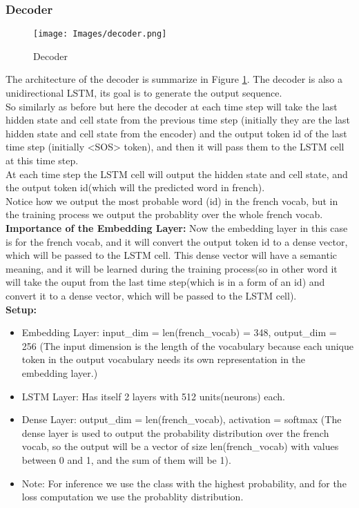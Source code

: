 \documentclass{article}
\begin{document}
\subsubsection{Decoder}
\begin{figure}[H]
    \centering
    \texttt{[image: Images/decoder.png]}
    \caption{Decoder}
    \label{fig:decoder}
\end{figure}
The architecture of the decoder is summarize in Figure \hyperref[fig:decoder]{\ref*{fig:decoder}}.
The decoder is also a unidirectional LSTM, its goal is to generate the output sequence.\\ So similarly as before but here the decoder at each time step will take the last hidden state and cell state from the previous time step (initially they are the last hidden state and cell state from the encoder) and the output token id of the last time step (initially <SOS> token), and then it will pass them to the LSTM cell  at this time step.\\
At each time step the LSTM cell will output the hidden state and cell state, and the output token id(which will the predicted word in french).\\Notice how we output the most probable word (id) in the french vocab, but in the training process we output the probablity over the whole french vocab.\\
\textbf{Importance of the Embedding Layer:} Now the embedding layer in this case is for the french vocab, and it will convert the output token id to a dense vector, which will be passed to the LSTM cell. This dense vector will have a semantic meaning, and it will be learned during the training process(so in other word it will take the ouput from the last time step(which is in a form of an id) and convert it to a dense vector, which will be passed to the LSTM cell).\\
\textbf{Setup:}
\begin{itemize}
    \item Embedding Layer: input\_dim = len(french\_vocab) = 348, output\_dim = 256 (The input dimension is the length of the vocabulary because each unique token in the output vocabulary needs its own representation in the embedding layer.)
    \item LSTM Layer: Has itself 2 layers with 512 units(neurons) each.
    \item Dense Layer: output\_dim = len(french\_vocab), activation = softmax (The dense layer is used to output the probability distribution over the french vocab, so the output will be a vector of size len(french\_vocab) with values between 0 and 1, and the sum of them will be 1).
    \item Note: For inference we use the class with the highest probability, and for the loss computation we use the probablity distribution. 
\end{itemize}
\end{document}
